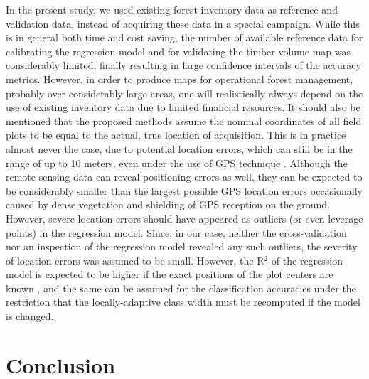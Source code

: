 In the present study, we used existing forest inventory data as reference and validation data, instead of acquiring these data in a special campaign. While this is in general both time and cost saving, the number of available reference data for calibrating the regression model and for validating the timber volume map was considerably limited, finally resulting in large confidence intervals of the accuracy metrics. However, in order to produce maps for operational forest management, probably over considerably large areas, one will realistically always depend on the use of existing inventory data due to limited financial resources. It should also be mentioned that the proposed methods assume the nominal coordinates of all field plots to be equal to the actual, true location of acquisition. This is in practice almost never the case, due to potential location errors, which can still be in the range of up to 10 meters, even under the use of GPS technique \citep{mauro2010, steinmann2013}. Although the remote sensing data can reveal positioning errors as well, they can be expected to be considerably smaller than the largest possible GPS location errors occasionally caused by dense vegetation and shielding of GPS reception on the ground. However, severe location errors should have appeared as outliers (or even leverage points) in the regression model. Since, in our case, neither the cross-validation nor an inspection of the regression model revealed any such outliers, the severity of location errors was assumed to be small. However, the R$^2$ of the regression model is expected to be higher if the exact positions of the plot centers are known \citep{fuller2009}, and the same can be assumed for the classification accuracies under the restriction that the locally-adaptive class width must be recomputed if the model is changed.



\section{Conclusion}
\label{sec:conc}

